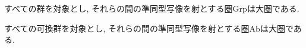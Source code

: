 \begin{comment}
*************************
\begin{Prop}
すべての小集合\footnote{「宇宙」で定義しているが, 現在本文から外している}を対象とし, それらの間の写像を射とする圏$\mathrm{Set}$は大圏である.
\end{Prop}
***************************
\end{comment}
\begin{Prop}
すべての群を対象とし, それらの間の準同型写像を射とする圏$\mathrm{Grp}$は大圏である.
\end{Prop}
\begin{Prop}
すべての可換群を対象とし, それらの間の準同型写像を射とする圏$\mathrm{Ab}$は大圏である.
\end{Prop}
\begin{comment}*************************
\begin{Prop}
すべての位相空間\footnote{定義を本文から外している}を対象とし, それらの間の連続写像\footnote{定義を本文から外している}を射とする圏$\mathrm{Top}$は大圏である.
\end{Prop}
\end{comment}
\begin{comment}*************************
\begin{example}
ある体\footnote{定義を本文から外している}$k$に対して,
すべての$k$次線形空間\footnote{未定義}を対象とし,
それらの間の$k$次線形写像\footnote{未定義}を射とする
圏$\mathrm{Vect}_k$は大圏である.
\end{example}
***************************\end{comment}
\begin{comment}
*************************
\subsection{部分圏}
\begin{Notation}
圏$C$における射$f,g\in\mathrm{Mor}(\mathscr{C})$の合成を$g\circ_{\mathscr{C}}f$で表す.
\end{Notation}
\begin{Def}
圏$\mathscr{A}$が圏$\mathscr{B}$に対して, 以下の条件を満たすとき, {\bf $\mathscr{A}$は$\mathscr{B}$の部分圏である}という.
\begin{enumerate}
\item $\mathrm{Obj}(\mathscr{A})\subset\mathrm{Obj}(\mathscr{B})$
\item $\mathscr{A}$の2つの対象の組の全体が,
$\mathscr{B}$の2つの対象の組の全体の部分集合である.
\item ...
\end{enumerate}
\end{Def}
\begin{Prop}
圏$\mathrm{Ab}$は圏$\mathrm{Grp}$の部分圏である.
\end{Prop}
***************************
\end{comment}
